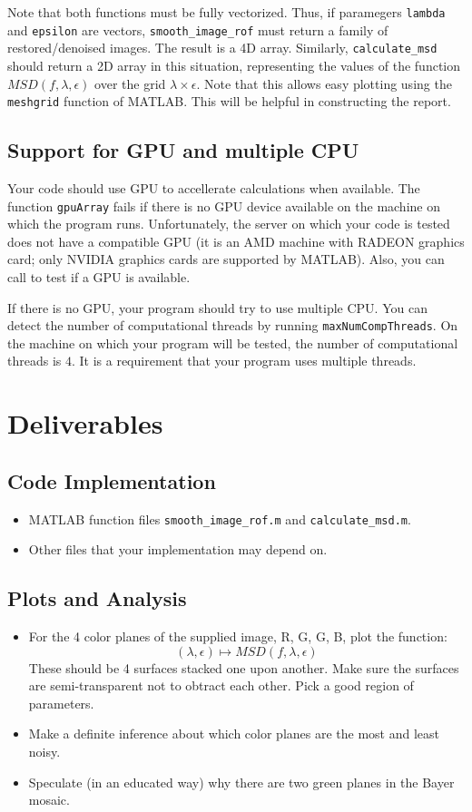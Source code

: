 \documentclass{article}
\begin{document}
Note that both functions must be fully vectorized. Thus, if paramegers
\texttt{lambda} and \texttt{epsilon} are vectors,
\texttt{smooth\_image\_rof} must return a family of restored/denoised
images. The result is a 4D array.  Similarly, \texttt{calculate\_msd}
should return a 2D array in this situation, representing the values of
the function $MSD(f, \lambda,\epsilon)$ over the grid
\(\lambda\times\epsilon\). Note that this allows easy plotting using
the \texttt{meshgrid} function of MATLAB. This will be helpful in
constructing the report.

\subsection{Support for GPU and multiple CPU}
Your code should use GPU to accellerate calculations when
available. The function \texttt{gpuArray} fails if there is no GPU
device available on the machine on which the program
runs. Unfortunately, the server on which your code is tested does not
have a compatible GPU (it is an AMD machine with RADEON graphics card;
only NVIDIA graphics cards are supported by MATLAB). Also, you can
call  to test if a GPU is available.

If there is no GPU, your program should try to use multiple CPU. You
can detect the number of computational threads by running
\texttt{maxNumCompThreads}.  On the machine on which your program will
be tested, the number of computational threads is \(4\).  It is a
requirement that your program uses multiple threads.

\section{Deliverables}
\subsection{Code Implementation}
\begin{itemize}
\item MATLAB function files \texttt{smooth\_image\_rof.m}
  and  \texttt{calculate\_msd.m}.
\item Other files that your implementation may depend on.
\end{itemize}

\subsection{Plots and Analysis}
\begin{itemize}
\item For the 4 color planes of the supplied image, R, G, G, B,
  plot the function:
  \[ (\lambda, \epsilon) \mapsto MSD(f, \lambda, \epsilon ) \]
  These should be 4 surfaces stacked one upon another.
  Make sure the surfaces are semi-transparent
  not to obtract each other. Pick a good region of parameters.
\item Make a definite inference about which color planes
  are the most and least noisy.
\item Speculate (in an educated way) why there are
  two green planes in the Bayer mosaic.
\end{itemize}
\end{document}
